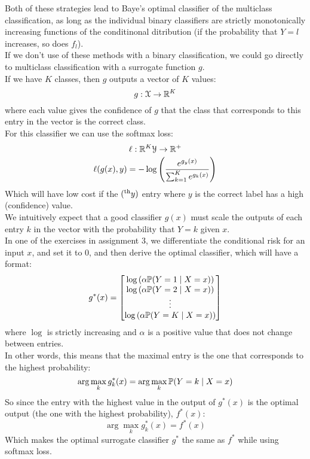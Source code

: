 \documentclass[12pt]{article}
\begin{document}
Both of these strategies lead to Baye's
optimal classifier of the multiclass classification,
as long as the individual binary classifiers
are strictly monotonically increasing
functions of the conditinonal
ditribution (if the probability that $Y = l$
increases, so does $f_l$). \\

If we don't use of these methods with a binary
classification, we could go directly
to multiclass classification with a surrogate
function $g$. \\

If we have $K$ classes, then $g$
outputs a vector of $K$ values:
\[ g: \mathcal{X} \to \mathbb{R}^K \]
where each value gives the confidence
of $g$ that the class that corresponds to this
entry in the vector is the correct class. \\

For this classifier we can use the softmax loss:
\[ \ell: \mathbb{R}^K \mathcal{Y} \to \mathbb{R}^+ \]
\[ \ell(g(x), y) = -\log\left( \dfrac{e^{g_y(x)}}
{\sum_{k = 1}^K e^{g_k(x)}} \right) \]
Which will have low cost if the $(^{\text{th}}y)$
entry where $y$ is the correct label
has a high (confidence) value. \\

We intuitively expect that a good classifier
$g(x)$ must scale the outputs of each entry $k$
in the vector with the probability
that $Y = k$ given $x$. \\

In one of the exercises in assignment 3,
we differentiate the conditional risk for an input $x$,
and set it to $0$,
and then derive the optimal classifier,
which will have a format:
\[ g^*(x)
    = \begin{bmatrix}
    \log\left( \alpha
    \mathbb{P}(Y = 1 \mid X = x) \right) \\
    \log\left( \alpha
    \mathbb{P}(Y = 2 \mid X = x) \right) \\ 
    \vdots \\
    \log\left( \alpha
    \mathbb{P}(Y = K \mid X = x) \right) \\ 
\end{bmatrix} \]
where $\log$ is strictly increasing
and $\alpha$ is a positive value
that does not change between entries. \\
In other words,
this means that the maximal entry
is the one that corresponds to the
highest probability:
\[ \arg\max_k g^*_k(x) = \arg \max_k
\mathbb{P}(Y = k \mid X = x) \]
So since the entry with the highest value
in the output of $g^*(x)$
is the optimal output (the one with the
highest probability), $f^*(x)$:
\[ \arg\max_k g^*_k(x) = f^*(x) \]
Which makes the optimal surrogate
classifier $g^*$ the same as $f^*$
while using softmax loss. \\
\end{document}
